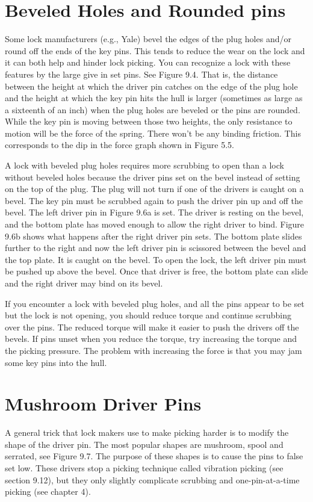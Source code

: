\section{Beveled Holes and Rounded pins}
Some lock manufacturers (e.g., Yale) bevel the edges of the plug holes and/or round off 
the ends of the key pins. This tends to reduce the wear on the lock and it can both help 
and hinder lock picking. You can recognize a lock with these features by the large give in 
set pins. See Figure 9.4. That is, the distance between the height at which the driver pin 
catches on the edge of the plug hole and the height at which the key pin hits the hull is larger 
(sometimes as large as a sixteenth of an inch) when the plug holes are beveled or the pins 
are rounded. While the key pin is moving between those two heights, the only resistance to 
motion will be the force of the spring. There won't be any binding friction. This corresponds 
to the dip in the force graph shown in Figure 5.5. 

A lock with beveled plug holes requires more scrubbing to open than a lock without 
beveled holes because the driver pins set on the bevel instead of setting on the top of the 
plug. The plug will not turn if one of the drivers is caught on a bevel. The key pin must 
be scrubbed again to push the driver pin up and off the bevel. The left driver pin in Figure 
9.6a is set. The driver is resting on the bevel, and the bottom plate has moved enough to 
allow the right driver to bind. Figure 9.6b shows what happens after the right driver pin 
sets. The bottom plate slides further to the right and now the left driver pin is scissored 
between the bevel and the top plate. It is caught on the bevel. To open the lock, the left 
driver pin must be pushed up above the bevel. Once that driver is free, the bottom plate can 
slide and the right driver may bind on its bevel. 

If you encounter a lock with beveled plug holes, and all the pins appear to be set but the 
lock is not opening, you should reduce torque and continue scrubbing over the pins. The 
reduced torque will make it easier to push the drivers off the bevels. If pins unset when you 
reduce the torque, try increasing the torque and the picking pressure. The problem with 
increasing the force is that you may jam some key pins into the hull. 

\section{Mushroom Driver Pins}
A general trick that lock makers use to make picking harder is to modify the shape of 
the driver pin. The most popular shapes are mushroom, spool and serrated, see Figure 
9.7. The purpose of these shapes is to cause the pins to false set low. These drivers stop a 
picking technique called vibration picking (see section 9.12), but they only slightly complicate 
scrubbing and one-pin-at-a-time picking (see chapter 4). 

